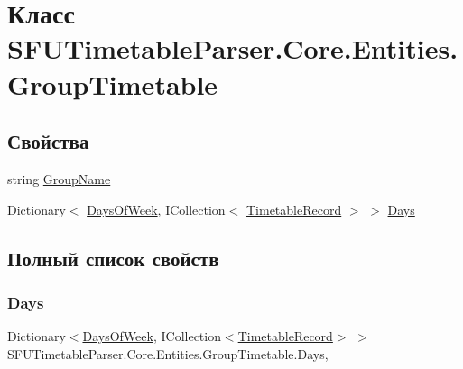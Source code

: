 \hypertarget{class_s_f_u_timetable_parser_1_1_core_1_1_entities_1_1_group_timetable}{}\section{Класс S\+F\+U\+Timetable\+Parser.\+Core.\+Entities.\+Group\+Timetable}
\label{class_s_f_u_timetable_parser_1_1_core_1_1_entities_1_1_group_timetable}
\subsection*{Свойства}
\begin{DoxyCompactItemize}
\item 
string \hyperlink{class_s_f_u_timetable_parser_1_1_core_1_1_entities_1_1_group_timetable_afa6a93b75f1dd384f72283cab9484fe7}{Group\+Name}
\item 
Dictionary$<$ \hyperlink{namespace_s_f_u_timetable_parser_1_1_core_1_1_entities_a24625cfb0f8355baf5eebfe2032c4169}{Days\+Of\+Week}, I\+Collection$<$ \hyperlink{class_s_f_u_timetable_parser_1_1_core_1_1_entities_1_1_timetable_record}{Timetable\+Record} $>$ $>$ \hyperlink{class_s_f_u_timetable_parser_1_1_core_1_1_entities_1_1_group_timetable_ae17c1f5237eb2e6b56f52847fc8269f5}{Days}
\end{DoxyCompactItemize}


\subsection{Полный список свойств}
\mbox{\label{class_s_f_u_timetable_parser_1_1_core_1_1_entities_1_1_group_timetable_ae17c1f5237eb2e6b56f52847fc8269f5}} 
\subsubsection{\texorpdfstring{Days}{Days}}
{\footnotesize\ttfamily Dictionary$<$\hyperlink{namespace_s_f_u_timetable_parser_1_1_core_1_1_entities_a24625cfb0f8355baf5eebfe2032c4169}{Days\+Of\+Week}, I\+Collection$<$\hyperlink{class_s_f_u_timetable_parser_1_1_core_1_1_entities_1_1_timetable_record}{Timetable\+Record}$>$ $>$ S\+F\+U\+Timetable\+Parser.\+Core.\+Entities.\+Group\+Timetable.\+Days\hspace{0.3cm}{\ttfamily [get]}, {\ttfamily [set]}}

